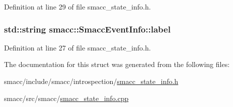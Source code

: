 Definition at line 29 of file smacc\+\_\+state\+\_\+info.\+h.

\subsubsection[{\texorpdfstring{label}{label}}]{\setlength{\rightskip}{0pt plus 5cm}std\+::string smacc\+::\+Smacc\+Event\+Info\+::label}\hypertarget{structsmacc_1_1SmaccEventInfo_a74bc1c4062af64481d4fdd40b66237bb}{}\label{structsmacc_1_1SmaccEventInfo_a74bc1c4062af64481d4fdd40b66237bb}


Definition at line 27 of file smacc\+\_\+state\+\_\+info.\+h.



The documentation for this struct was generated from the following files\+:\begin{DoxyCompactItemize}
\item 
smacc/include/smacc/introspection/\hyperlink{smacc__state__info_8h}{smacc\+\_\+state\+\_\+info.\+h}\item 
smacc/src/smacc/\hyperlink{smacc__state__info_8cpp}{smacc\+\_\+state\+\_\+info.\+cpp}\end{DoxyCompactItemize}
